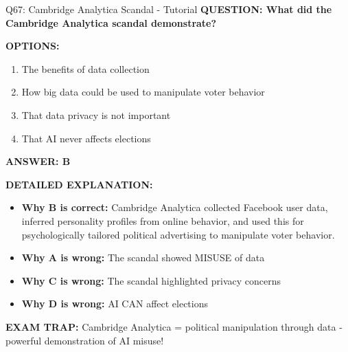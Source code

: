 \documentclass[8pt]{beamer}
\begin{document}
	\begin{frame}{Q67: Cambridge Analytica Scandal - Tutorial}
		\fontsize{6.5}{7.5}\selectfont
		\textbf{QUESTION: What did the Cambridge Analytica scandal demonstrate?}
		
		\vspace{0.1cm}
		\textbf{OPTIONS:}
		\begin{enumerate}
			\item The benefits of data collection
			\item How big data could be used to manipulate voter behavior
			\item That data privacy is not important
			\item That AI never affects elections
		\end{enumerate}
		
		\vspace{0.1cm}
		\textcolor{myblue}{\textbf{ANSWER: B}}
		
		\vspace{0.1cm}
		\textbf{DETAILED EXPLANATION:}
		\begin{itemize}
			\item \textbf{Why B is correct:} Cambridge Analytica collected Facebook user data, inferred personality profiles from online behavior, and used this for psychologically tailored political advertising to manipulate voter behavior.
			\item \textbf{Why A is wrong:} The scandal showed MISUSE of data
			\item \textbf{Why C is wrong:} The scandal highlighted privacy concerns
			\item \textbf{Why D is wrong:} AI CAN affect elections
		\end{itemize}
		
		\textcolor{myred}{\textbf{EXAM TRAP:}} Cambridge Analytica = \textcolor{myblue}{political manipulation through data} - powerful demonstration of AI misuse!
	\end{frame}
	
\end{document}
